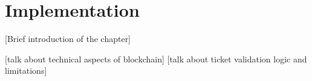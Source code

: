 \chapter{Implementation}
 [Brief introduction of the chapter]


 [talk about technical aspects of blockchain]
 [talk about ticket validation logic and limitations]
